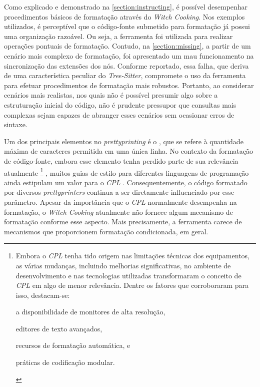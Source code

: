 \documentclass
  [11pt,a4paper,english,brazil,openright,sumario=tradicional,twoside]
  {abntex2}
\newcommand{\treesitter}{\textit{Tree-Sitter}\xspace}
\newcommand{\witchcooking}{\textit{Witch Cooking}\xspace}
\begin{document}
  Como explicado e demonstrado na \cref{section:instructing}, é possível
  desempenhar procedimentos básicos de formatação através do \witchcooking. Nos
  exemplos utilizados, é perceptível que o código-fonte submetido para
  formatação já possui uma organização razoável. Ou seja, a ferramenta foi
  utilizada para realizar operações pontuais de formatação. Contudo, na
  \cref{section:missing}, a partir de um cenário mais complexo de formatação,
  foi apresentado um mau funcionamento na sincronização das extensões dos nós.
  Conforme reportado, essa falha, que deriva de uma característica peculiar do
  \treesitter, compromete o uso da ferramenta para efetuar procedimentos de
  formatação mais robustos. Portanto, ao considerar cenários mais realistas,
  nos quais não é possível presumir algo sobre a estruturação inicial do
  código, não é prudente pressupor que consultas mais complexas sejam capazes
  de abranger esses cenários sem ocasionar erros de sintaxe.

  Um dos principais elementos no \textit{prettyprinting} é o
  \textit{}, que se refere à quantidade máxima de caracteres
  permitida em uma única linha. No contexto da formatação de código-fonte,
  embora esse elemento tenha perdido parte de sua relevância atualmente%
  \footnote
    { Embora o \textit{CPL} tenha tido origem nas limitações técnicas dos
      equipamentos, as várias mudanças, incluindo melhorias significativas, no
      ambiente de desenvolvimento e nas tecnologias utilizadas transformaram o
      conceito de \textit{CPL} em algo de menor relevância. Dentre os fatores
      que corroboraram para isso, destacam-se:
      \begin{inparaenum}
        \item a disponibilidade de monitores de alta resolução,
        \item editores de texto avançados,
        \item recursos de formatação automática, e
        \item práticas de codificação modular.
      \end{inparaenum}}%
  , muitos guias de estilo para diferentes linguagens de programação ainda
  estipulam um valor para o \textit{CPL} \cite{wiki-2023-characters}.
  Consequentemente, o código formatado por diversos \textit{prettyprinters}
  continua a ser diretamente influenciado por esse parâmetro. Apesar da
  importância que o \textit{CPL} normalmente desempenha na formatação, o
  \witchcooking atualmente não fornece algum mecanismo de formatação conforme
  esse aspecto. Mais precisamente, a ferramenta carece de mecanismos que
  proporcionem formatação condicionada, em geral.
\end{document}
